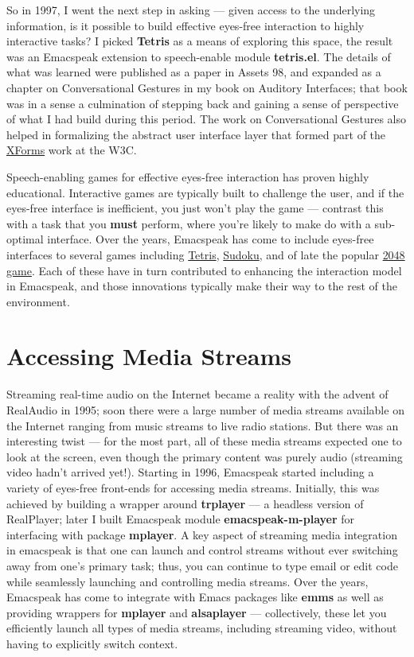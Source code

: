 \documentclass[11pt]{article}
\begin{document}
So in 1997, I went the next step in asking — given access to the
underlying information, is it possible to build effective
eyes-free interaction to highly interactive tasks? I picked
\textbf{Tetris} as a means of exploring this space, the result was an
Emacspeak extension to speech-enable module \textbf{tetris.el}. The
details of what was learned were published as a paper in Assets
98, and expanded as a chapter on Conversational Gestures in my
book on Auditory Interfaces; that book was in a sense a
culmination of stepping back and gaining a sense of perspective
of what I had build during this period. The work on
Conversational Gestures also helped in formalizing the abstract
user interface layer that formed part of the
\href{http://www.w3.org/MarkUp/Forms/}{XForms} work at the W3C.

Speech-enabling games for effective eyes-free interaction has
proven highly educational. Interactive games are typically built
to challenge the user, and if the eyes-free interface is
inefficient, you just won't play the game — contrast this with a
task that you \textbf{must} perform, where you're likely to make do with
a sub-optimal interface. Over the years, Emacspeak has come to
include eyes-free interfaces to several games including \href{http://en.wikipedia.org/wiki/Tetris}{Tetris},
\href{http://en.wikipedia.org/wiki/2048\_(video\_game)}{Sudoku}, and of late the popular \href{http://en.wikipedia.org/wiki/2048\_(video\_game)}{2048 game}. Each of these have in
turn contributed to enhancing the interaction model in Emacspeak,
and those innovations typically make their way to the rest of the
environment.


\section{Accessing Media Streams}
\label{sec:org9b5ce3b}

Streaming real-time audio on the Internet became a reality with
the advent of RealAudio in 1995; soon there were a large number
of media streams available on the Internet ranging from music
streams to live radio stations. But there was an interesting
twist — for the most part, all of these media streams expected
one to look at the screen, even though the primary content was
purely audio (streaming video hadn't arrived yet!). Starting in
1996, Emacspeak started including a variety of eyes-free
front-ends for accessing media streams. Initially, this was
achieved by building a wrapper around \textbf{trplayer} — a headless
version of RealPlayer; later I built Emacspeak module
\textbf{emacspeak-m-player} for interfacing with package \textbf{mplayer}. A
key aspect of streaming media integration in emacspeak is that
one can launch and control streams without ever switching away
from one's primary task; thus, you can continue to type email or
edit code while seamlessly launching and controlling media
streams. Over the years, Emacspeak has come to integrate with
Emacs packages like \textbf{emms} as well as providing wrappers for
\textbf{mplayer} and \textbf{alsaplayer} — collectively, these let you
efficiently launch all types of media streams, including
streaming video, without having to explicitly switch context.
\end{document}
